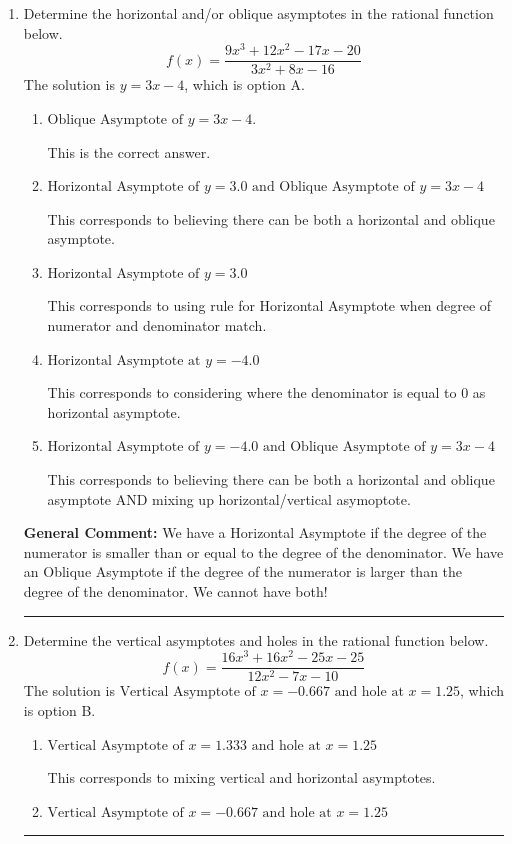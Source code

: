 \documentclass{extbook}[14pt]
\newcommand{\litem}[1]{\item #1

\rule{\textwidth}{0.4pt}}
\begin{document}
\begin{enumerate}\litem{
Determine the horizontal and/or oblique asymptotes in the rational function below.
\[ f(x) = \frac{9x^{3} +12 x^{2} -17 x -20}{3x^{2} +8 x -16} \]The solution is \( y = 3x -4 \), which is option A.\begin{enumerate}[label=\Alph*.]
\item \( \text{Oblique Asymptote of } y = 3x -4. \)

This is the correct answer.
\item \( \text{Horizontal Asymptote of } y = 3.0 \text{ and Oblique Asymptote of } y = 3x -4 \)

This corresponds to believing there can be both a horizontal and oblique asymptote.
\item \( \text{Horizontal Asymptote of } y = 3.0  \)

This corresponds to using rule for Horizontal Asymptote when degree of numerator and denominator match.
\item \( \text{Horizontal Asymptote at } y = -4.0 \)

This corresponds to considering where the denominator is equal to 0 as horizontal asymptote.
\item \( \text{Horizontal Asymptote of } y = -4.0 \text{ and Oblique Asymptote of } y = 3x -4 \)

This corresponds to believing there can be both a horizontal and oblique asymptote AND mixing up horizontal/vertical asymoptote.
\end{enumerate}

\textbf{General Comment:} We have a Horizontal Asymptote if the degree of the numerator is smaller than or equal to the degree of the denominator. We have an Oblique Asymptote if the degree of the numerator is larger than the degree of the denominator. We cannot have both!
}
\litem{
Determine the vertical asymptotes and holes in the rational function below.
\[ f(x) = \frac{16x^{3} +16 x^{2} -25 x -25}{12x^{2} -7 x -10} \]The solution is \( \text{Vertical Asymptote of } x = -0.667 \text{ and hole at } x = 1.25 \), which is option B.\begin{enumerate}[label=\Alph*.]
\item \( \text{Vertical Asymptote of } x = 1.333 \text{ and hole at } x = 1.25 \)

This corresponds to mixing vertical and horizontal asymptotes.
\item \( \text{Vertical Asymptote of } x = -0.667 \text{ and hole at } x = 1.25 \)


\end{enumerate}}
\end{enumerate}
\end{document}

